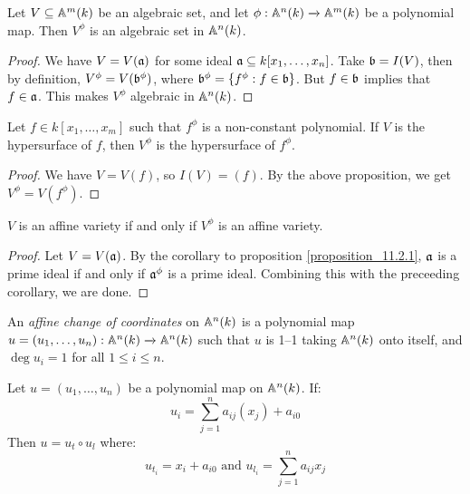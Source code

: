 \begin{proposition}\label{proposition_11.2.2}
  Let $V \subseteq \A^m(k)$ be an algebraic set, and let
  $\phi:\A^n(k) \xrightarrow{} \A^m(k)$ be a polynomial map. Then
  $V^\phi$ is an algebraic set in $\A^n(k)$.
\end{proposition}
\begin{proof}
  We have $V=V(\af)$ for some ideal $\af \subseteq k[x_1, \dots,
  x_n]$. Take $\bf=I(V)$, then by definition, $V^\phi=V(\bf^\phi)$,
  where $\bf^\phi=\{f^\phi : f \in \bf\}$. But $f \in \bf$ implies
  that $f \in \af$. This makes $V^\phi$ algebraic in $\A^n(k)$.
\end{proof}
\begin{corollary}
  Let $f \in k[x_1, \dots, x_m]$ such that $f^\phi$ is a
  non-constant polynomial. If $V$ is the hypersurface of $f$, then
  $V^\phi$ is the hypersurface of $f^\phi$.
\end{corollary}
\begin{proof}
  We have $V=V(f)$, so $I(V)=(f)$. By the above proposition, we get
  $V^\phi=V(f^\phi)$.
\end{proof}
\begin{corollary}
  $V$ is an affine variety if and only if $V^\phi$ is an affine
  variety.
\end{corollary}
\begin{proof}
  Let $V=V(\af)$. By the corollary to proposition \ref{proposition_11.2.1},
  $\af$ is a prime ideal if and only if $\af^\phi$ is a prime ideal.
  Combining this with the preceeding corollary, we are done.
\end{proof}

\begin{defintion}
  An \textit{affine change of coordinates} on $\A^n(k)$ is a
  polynomial map $u=(u_1, \dots, u_n):\A^n(k) \xrightarrow{}
  \A^n(k)$ such that $u$ is 1--1 taking $\A^n(k)$ onto itself, and
  $\deg{u_i}=1$ for all $1 \leq i \leq n$.
\end{defintion}

\begin{proposition}\label{proposition_11.2.3}
  Let $u=(u_1, \dots, u_n)$ be a polynomial map on $\A^n(k)$. If:
  \begin{equation}\label{equation_11.2}
    u_i=\sum_{j=1}^n{a_{ij}(x_j)}+a_{i0}
  \end{equation}
  Then $u=u_t \circ u_l$ where:
  \begin{equation}\label{equation_11.3}
    u_{t_i}=x_i+a_{i0} \text{ and } u_{l_i}=\sum_{j=1}^n{a_{ij}x_j}
  \end{equation}
\end{proposition}

